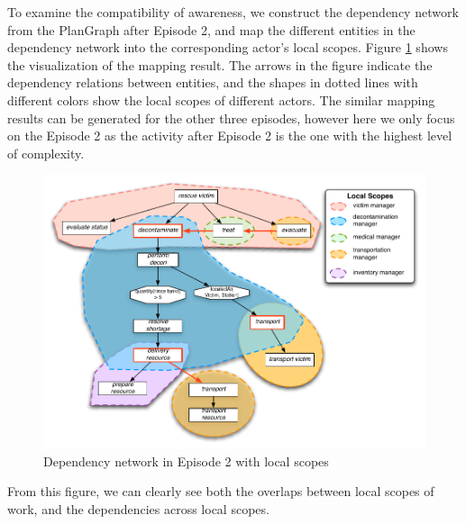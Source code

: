 To examine the compatibility of awareness, we construct the dependency network from the PlanGraph after Episode 2, and map the different entities in the dependency network into the corresponding actor's local scopes. Figure \ref{fig:dependencies_ep2} shows the visualization of the mapping result. The arrows in the figure indicate the dependency relations between entities, and the shapes in dotted lines with different colors show the local scopes of different actors. The similar mapping results can be generated for the other three episodes, however here we only focus on the Episode 2 as the activity after Episode 2 is the one with the highest level of complexity.

\begin{figure}[htbp] %
	\centering
	\includegraphics[width=5.8in]{dependencies_ep2.pdf} 
	\caption{Dependency network in Episode 2 with local scopes}
	\label{fig:dependencies_ep2}
\end{figure}

From this figure, we can clearly see both the overlaps between local scopes of work, and the dependencies across local scopes. 

